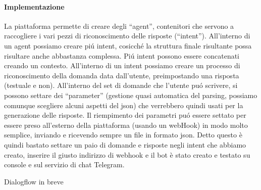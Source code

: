 \documentclass[]{article}
\begin{document}
\paragraph{Implementazione}
La piattaforma permette di creare degli “agent”, contenitori che servono a raccogliere i vari pezzi di riconoscimento delle risposte (“intent”). All’interno di un agent possiamo creare piú intent, cosicché  la struttura finale risultante possa risultare anche abbastanza complessa. Piú intent possono essere concatenati creando un contesto. All’interno di un intent possiamo creare un processo di riconoscimento della domanda data dall’utente, preimpostando una risposta (testuale e non). All’interno del set di domande che l’utente puó scrivere, si possono settare dei “parameter” (gestione quasi automatica del parsing, possiamo comunque scegliere alcuni aspetti del json) che verrebbero quindi usati per la generazione delle risposte. Il riempimento dei parametri puó essere settato per essere preso all’esterno della piattaforma (usando un webHook) in modo molto semplice, inviando e ricevendo sempre un file in formato json. Detto questo è quindi bastato settare un paio di domande e risposte negli intent che abbiamo creato, inserire il giusto indirizzo di webhook e il bot è stato creato e testato su console e sul servizio di chat Telegram.

\begin{center}
\footnotesize{Dialogflow in breve}
\end{center}

\pagebreak
\end{document}
